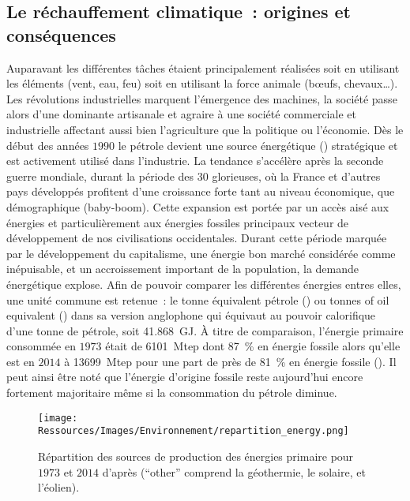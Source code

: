 \subsection{Le réchauffement climatique~: origines et conséquences} %
\label{sub:le_rechauffement_climatique_origines_et_consequences}
Auparavant les différentes tâches étaient principalement réalisées soit en utilisant les
éléments (vent, eau, feu) soit en utilisant la force animale (bœufs, chevaux\dots). Les
révolutions industrielles marquent l’émergence des machines, la société passe alors d’une
dominante artisanale et agraire à une société commerciale et industrielle affectant aussi
bien l’agriculture que la politique ou l’économie. Dès le début des années $1990$ le
pétrole devient une source énergétique () stratégique et est
activement utilisé dans l’industrie. La tendance s’accélère après la seconde guerre
mondiale, durant la période des $30$ glorieuses, où la France et d’autres pays développés
profitent d’une croissance forte tant au niveau économique, que démographique (baby-boom).
Cette expansion est portée par un accès aisé aux énergies et particulièrement aux énergies
fossiles principaux vecteur de développement de nos civilisations occidentales. Durant
cette période marquée par le développement du capitalisme, une énergie bon marché
considérée comme inépuisable, et un accroissement important de la population, la demande
énergétique explose. Afin de pouvoir comparer les différentes énergies entres elles, une
unité commune est retenue~: le tonne équivalent pétrole () ou tonnes of oil
equivalent () dans sa version anglophone qui équivaut au pouvoir calorifique
d’une tonne de pétrole, soit \SI{41.868}{\giga\joule}.
À titre de comparaison, l’énergie primaire consommée en $1973$ était de
\SI{6101}{\mega tep} dont \SI{87}{\percent} en énergie fossile alors qu’elle est en $2014$
à \SI{13699}{\mega tep} pour une part de près de \SI{81}{\percent} en énergie fossile
(). Il peut ainsi être noté que l’énergie d’origine fossile
reste aujourd’hui encore fortement majoritaire même si la consommation du pétrole diminue.

\begin{figure}
    \centering
    \texttt{[image: Ressources/Images/Environnement/repartition\_energy.png]}
    \caption{Répartition des sources de production des énergies primaire pour
             $1973$ et $2014$ d’après \textcite{IEA2016} (\enquote{other} comprend
             la géothermie, le solaire, et l’éolien).}
    \label{fig:energy_fraction}
\end{figure}


